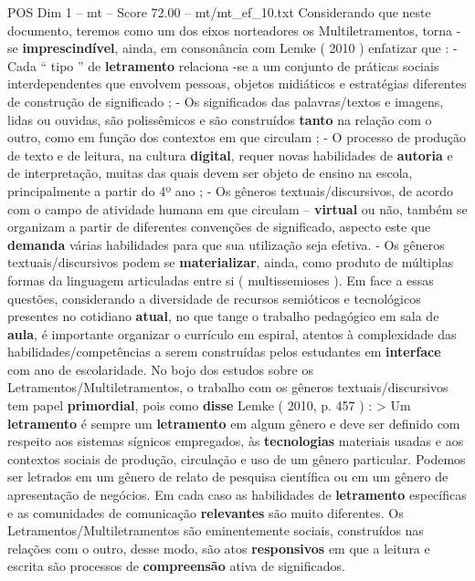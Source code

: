 \begin{textsample}{POS Dim 1 – mt – Score 72.00 – mt/mt\_ef\_10.txt}
Considerando que neste documento, teremos como um dos eixos norteadores os Multiletramentos, torna -se \textbf{imprescindível}, ainda, em consonância com Lemke ( 2010 ) enfatizar que : - Cada “ tipo ” de \textbf{letramento} relaciona -se a um conjunto de práticas sociais interdependentes que envolvem pessoas, objetos midiáticos e estratégias diferentes de construção de significado ; - Os significados das palavras/textos e imagens, lidas ou ouvidas, são polissêmicos e são construídos \textbf{tanto} na relação com o outro, como em função dos contextos em que circulam ; - O processo de produção de texto e de leitura, na cultura \textbf{digital}, requer novas habilidades de \textbf{autoria} e de interpretação, muitas das quais devem ser objeto de ensino na escola, principalmente a partir do 4º ano ; - Os gêneros textuais/discursivos, de acordo com o campo de atividade humana em que circulam – \textbf{virtual} ou não, também se organizam a partir de diferentes convenções de significado, aspecto este que \textbf{demanda} várias habilidades para que sua utilização seja efetiva. - Os gêneros textuais/discursivos podem se \textbf{materializar}, ainda, como produto de múltiplas formas da linguagem articuladas entre si ( multissemioses ).
Em face a essas questões, considerando a diversidade de recursos semióticos e tecnológicos presentes no cotidiano \textbf{atual}, no que tange o trabalho pedagógico em sala de \textbf{aula}, é importante organizar o currículo em espiral, atentos à complexidade das habilidades/competências a serem construídas pelos estudantes em \textbf{interface} com ano de escolaridade.
No bojo dos estudos sobre os Letramentos/Multiletramentos, o trabalho com os gêneros textuais/discursivos tem papel \textbf{primordial}, pois como \textbf{disse} Lemke ( 2010, p. 457 ) : > Um \textbf{letramento} é sempre um \textbf{letramento} em algum gênero e deve ser definido com respeito aos sistemas sígnicos empregados, às \textbf{tecnologias} materiais usadas e aos contextos sociais de produção, circulação e uso de um gênero particular.
Podemos ser letrados em um gênero de relato de pesquisa científica ou em um gênero de apresentação de negócios.
Em cada caso as habilidades de \textbf{letramento} específicas e as comunidades de comunicação \textbf{relevantes} são muito diferentes.
Os Letramentos/Multiletramentos são eminentemente sociais, construídos nas relações com o outro, desse modo, são atos \textbf{responsivos} em que a leitura e escrita são processos de \textbf{compreensão} ativa de significados.

\end{textsample}
